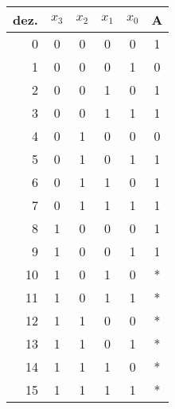 \documentclass[10pt,a4paper,oneside,ngerman,numbers=noenddot]{scrartcl}
\begin{document}
\section{} %
\subsection{} %
\begin{tabular}{r|ccccc}
dez.& $x_{3}$	& $x_{2}$	& $x_{1}$	& $x_{0}$	& A \\
\hline
0	& 0 		& 0			& 0			& 0		  	& 1 \\
1	& 0			& 0			& 0			& 1		  	& 0 \\
2	& 0			& 0			& 1			& 0			& 1 \\
3	& 0			& 0			& 1			& 1			& 1 \\
4	& 0			& 1			& 0			& 0			& 0 \\
5	& 0			& 1			& 0 		& 1			& 1 \\
6	& 0			& 1			& 1			& 0			& 1 \\
7	& 0			& 1			& 1			& 1			& 1 \\
8	& 1			& 0			& 0			& 0			& 1 \\
9	& 1			& 0			& 0			& 1			& 1 \\
10	& 1			& 0			& 1			& 0			& * \\
11	& 1			& 0			& 1 		& 1			& * \\
12	& 1			& 1			& 0			& 0			& * \\
13 	& 1			& 1			& 0			& 1			& * \\
14	& 1			& 1			& 1			& 0			& * \\
15	& 1			& 1			& 1			& 1			& *
\end{tabular}
\end{document}
